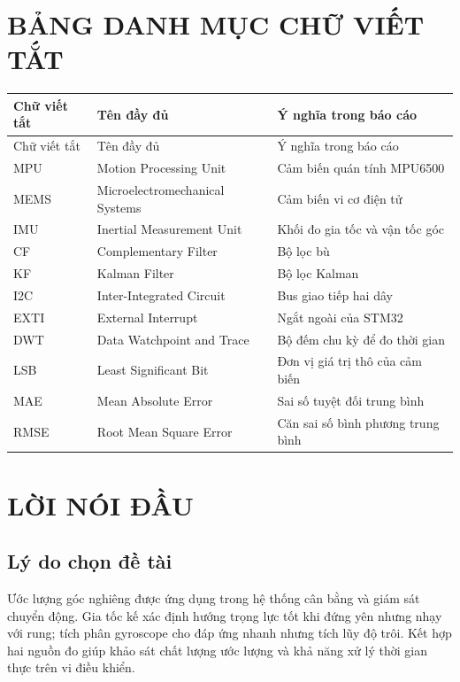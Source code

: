 \documentclass[14pt,a4paper,oneside]{extreport}
\begin{document}
\chapter*{BẢNG DANH MỤC CHỮ VIẾT TẮT}
\begin{longtable}{|C{23mm}|C{54mm}|C{64mm}|}
\hline
Chữ viết tắt & Tên đầy đủ & Ý nghĩa trong báo cáo\\ \hline
\hline
\endfirsthead
\hline Chữ viết tắt & Tên đầy đủ & Ý nghĩa trong báo cáo\\ \hline
\endhead
MPU & Motion Processing Unit & Cảm biến quán tính MPU6500\\ \hline
MEMS & Microelectromechanical Systems & Cảm biến vi cơ điện tử\\ \hline
IMU & Inertial Measurement Unit & Khối đo gia tốc và vận tốc góc\\ \hline
CF & Complementary Filter & Bộ lọc bù\\ \hline
KF & Kalman Filter & Bộ lọc Kalman\\ \hline
I2C & Inter-Integrated Circuit & Bus giao tiếp hai dây\\ \hline
EXTI & External Interrupt & Ngắt ngoài của STM32\\ \hline
DWT & Data Watchpoint and Trace & Bộ đếm chu kỳ để đo thời gian\\ \hline
LSB & Least Significant Bit & Đơn vị giá trị thô của cảm biến\\ \hline
MAE & Mean Absolute Error & Sai số tuyệt đối trung bình\\ \hline
RMSE & Root Mean Square Error & Căn sai số bình phương trung bình\\ \hline
\hline
\end{longtable}
\clearpage

\chapter*{LỜI NÓI ĐẦU}
\section*{Lý do chọn đề tài}
Ước lượng góc nghiêng được ứng dụng trong hệ thống cân bằng và giám sát chuyển động. Gia tốc kế xác định hướng trọng lực tốt khi đứng yên nhưng nhạy với rung; tích phân gyroscope cho đáp ứng nhanh nhưng tích lũy độ trôi. Kết hợp hai nguồn đo giúp khảo sát chất lượng ước lượng và khả năng xử lý thời gian thực trên vi điều khiển.
\end{document}
